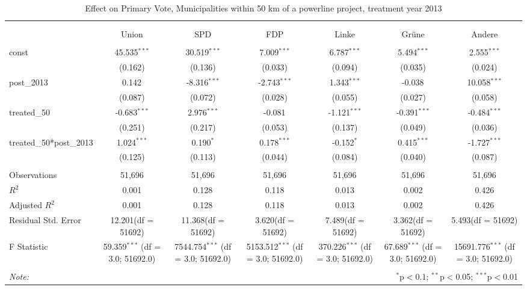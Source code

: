 \documentclass[12pt]{article}
\begin{document}
\begin{table}[!htbp] \centering
  \caption{Effect on Primary Vote, Municipalities within 50 km of a powerline project, treatment year 2013}
\begin{tabular}{@{\extracolsep{5pt}}lcccccc}
\\[-1.8ex]\hline
\hline \\[-1.8ex]
\\[-1.8ex] & \multicolumn{1}{c}{Union} & \multicolumn{1}{c}{SPD} & \multicolumn{1}{c}{FDP} & \multicolumn{1}{c}{Linke} & \multicolumn{1}{c}{Grüne} & \multicolumn{1}{c}{Andere}  \\
\hline \\[-1.8ex]
 const & 45.535$^{***}$ & 30.519$^{***}$ & 7.009$^{***}$ & 6.787$^{***}$ & 5.494$^{***}$ & 2.555$^{***}$ \\
  & (0.162) & (0.136) & (0.033) & (0.094) & (0.035) & (0.024) \\
 post_2013 & 0.142$^{}$ & -8.316$^{***}$ & -2.743$^{***}$ & 1.343$^{***}$ & -0.038$^{}$ & 10.058$^{***}$ \\
  & (0.087) & (0.072) & (0.028) & (0.055) & (0.027) & (0.058) \\
 treated_50 & -0.683$^{***}$ & 2.976$^{***}$ & -0.081$^{}$ & -1.121$^{***}$ & -0.391$^{***}$ & -0.484$^{***}$ \\
  & (0.251) & (0.217) & (0.053) & (0.137) & (0.049) & (0.036) \\
 treated_50*post_2013 & 1.024$^{***}$ & 0.190$^{*}$ & 0.178$^{***}$ & -0.152$^{*}$ & 0.415$^{***}$ & -1.727$^{***}$ \\
  & (0.125) & (0.113) & (0.044) & (0.084) & (0.040) & (0.087) \\
\hline \\[-1.8ex]
 Observations & 51,696 & 51,696 & 51,696 & 51,696 & 51,696 & 51,696 \\
 $R^2$ & 0.001 & 0.128 & 0.118 & 0.013 & 0.002 & 0.426 \\
 Adjusted $R^2$ & 0.001 & 0.128 & 0.118 & 0.013 & 0.002 & 0.426 \\
 Residual Std. Error & 12.201(df = 51692) & 11.368(df = 51692) & 3.620(df = 51692) & 7.489(df = 51692) & 3.362(df = 51692) & 5.493(df = 51692)  \\
 F Statistic & 59.359$^{***}$ (df = 3.0; 51692.0) & 7544.754$^{***}$ (df = 3.0; 51692.0) & 5153.512$^{***}$ (df = 3.0; 51692.0) & 370.226$^{***}$ (df = 3.0; 51692.0) & 67.689$^{***}$ (df = 3.0; 51692.0) & 15691.776$^{***}$ (df = 3.0; 51692.0) \\
\hline
\hline \\[-1.8ex]
\textit{Note:} & \multicolumn{6}{r}{$^{*}$p$<$0.1; $^{**}$p$<$0.05; $^{***}$p$<$0.01} \\
\end{tabular}
\end{table}
\end{document}
